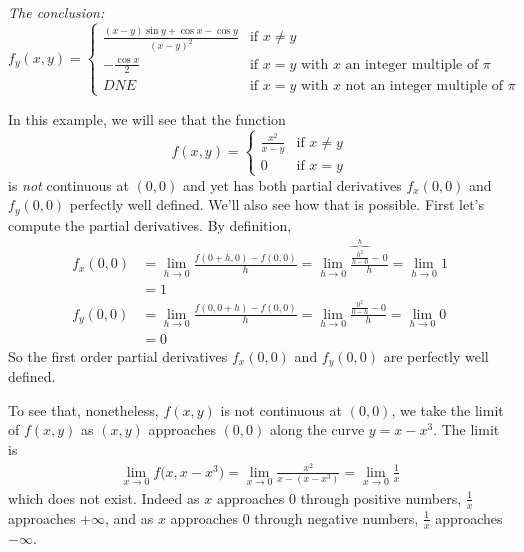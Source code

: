 \begin{eg}
\medskip
\noindent
\emph{The conclusion:\ \ \ }
\begin{equation*}
f_y(x,y)=\begin{cases}
             \frac{(x-y)\sin y
                  + \cos x-\cos y }{(x-y)^2}&\text{if $x\ne y$}\\ 
                    -\frac{\cos x}{2}&\text{if $x=y$ with $x$ an integer 
                                             multiple of $\pi$} \\
                    DNE&\text{if $x=y$ with $x$ not an integer 
                                             multiple of $\pi$}
        \end{cases}
\end{equation*}
\end{eg}
\begin{eg}\label{eg partials DDD}
In this example, we will see that the function
\begin{equation*}
f(x,y)=\begin{cases}
             \frac{x^2}{x-y}&\text{if $x\ne y$}\\ 
                    0&\text{if $x=y$}
        \end{cases}
\end{equation*}
is \emph{not} continuous at $(0,0)$ and yet has both partial derivatives 
$f_x(0,0)$ and $f_y(0,0)$ perfectly well defined. We'll also see how that is possible. First let's compute the partial derivatives. By definition,
\begin{align*}
f_x(0,0)&=\lim_{h\rightarrow 0}\frac{f(0+h,0)-f(0,0)}{h}
         =\lim_{h\rightarrow 0}\frac{\overbrace{\tfrac{h^2}{h-0}}^{h}-\,0}{h}
         =\lim_{h\rightarrow 0}1 \\
         &=1 \\
f_y(0,0)&=\lim_{h\rightarrow 0}\frac{f(0,0+h)-f(0,0)}{h}
         =\lim_{h\rightarrow 0}\frac{\frac{0^2}{0-h}-0}{h}
         =\lim_{h\rightarrow 0}0 \\
         &=0 
\end{align*}
So the first order partial derivatives $f_x(0,0)$ and $f_y(0,0)$ are perfectly well defined.

To see that, nonetheless, $f(x,y)$ is not continuous at $(0,0)$, we take the limit of $f(x,y)$ as $(x,y)$ approaches $(0,0)$ along the curve $y=x-x^3$.
The limit is
\begin{align*}
\lim_{x\rightarrow 0} f\big(x,x-x^3\big)
=\lim_{x\rightarrow 0} \frac{x^2}{x-(x-x^3)}
=\lim_{x\rightarrow 0} \frac{1}{x}
\end{align*}
which does not exist. Indeed as $x$ approaches $0$ through positive numbers,
$\frac{1}{x}$ approaches $+\infty$, and as $x$ approaches $0$ through negative
numbers, $\frac{1}{x}$ approaches $-\infty$.


\end{eg}
